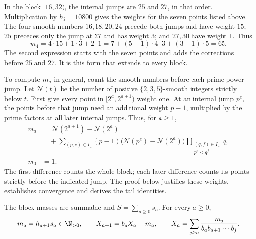 In the block $[16,32)$, the internal jumps are $25$ and $27$, in that
order. Multiplication by $h_5=10800$ gives the weights for the seven
points listed above.  The four smooth numbers
$16,18,20,24$ precede both jumps and have weight $15$; $25$ precedes only
the jump at $27$ and has weight $3$; and $27,30$ have weight $1$.  Thus
\[
 m_4=4\cdot15+1\cdot3+2\cdot1
     =7+(5-1)\cdot4\cdot3+(3-1)\cdot5=65.
\]
The second expression starts with the seven points and adds the
corrections before $25$ and $27$.  It is this form that extends to every
block.

To compute $m_a$ in general, count the smooth numbers before each
prime-power jump.
Let $\mathcal N(t)$ be the number of positive $\{2,3,5\}$-smooth integers
strictly below $t$.  First give every point in $[2^a,2^{a+1})$ weight one.
At an internal jump $p^e$, the points before that jump need an additional
weight $p-1$, multiplied by the prime factors at all later internal jumps.
Thus, for $a\ge1$,
\begin{equation}\label{long269:eq:actual-digit}
\begin{aligned}
 m_a&=\mathcal N(2^{a+1})-\mathcal N(2^a)\\
 &\quad+\sum_{(p,e)\in I_a}(p-1)
       \bigl(\mathcal N(p^e)-\mathcal N(2^a)\bigr)
       \prod_{\substack{(q,f)\in I_a\\p^e<q^f}}q,\\
 m_0&=1.
\end{aligned}
\end{equation}
The first difference counts the whole block; each later difference counts
its points strictly before the indicated jump.  The proof below justifies
these weights, establishes convergence and derives the tail identities.

\begin{theorem}\label{long269:res:actual-orbit}
The block masses are summable and $S=\sum_{a\ge0}s_a$.  For every $a\ge0$,
\begin{equation}\label{long269:eq:shell-digit-identity}
 m_a=h_{a+1}s_a\in\N_{>0},
 \qquad
 X_{a+1}=b_aX_a-m_a,
 \qquad
 X_a=\sum_{j\ge a}\frac{m_j}{b_ab_{a+1}\cdots b_j} .
\end{equation}
\end{theorem}

